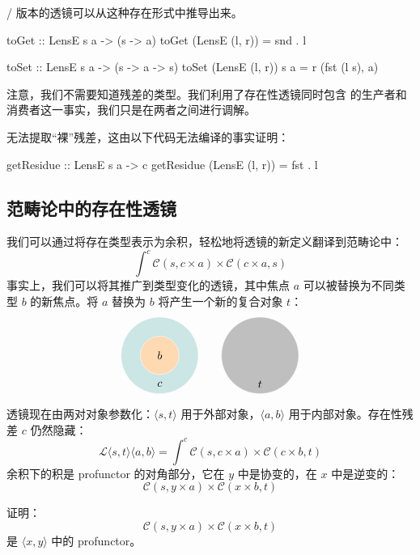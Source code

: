 \documentclass[DaoFP]{subfiles}
\begin{document}
/ 版本的透镜可以从这种存在形式中推导出来。
\begin{haskell}
toGet :: LensE s a -> (s -> a)
toGet (LensE (l, r)) = snd . l

toSet :: LensE s a -> (s -> a -> s)
toSet (LensE (l, r)) s a = r (fst (l s), a)
\end{haskell}

注意，我们不需要知道残差的类型。我们利用了存在性透镜同时包含  的生产者和消费者这一事实，我们只是在两者之间进行调解。

无法提取“裸”残差，这由以下代码无法编译的事实证明：
\begin{haskell}
getResidue :: LensE s a -> c
getResidue (LensE (l, r)) = fst . l
\end{haskell}

\subsection{范畴论中的存在性透镜}

我们可以通过将存在类型表示为余积，轻松地将透镜的新定义翻译到范畴论中：
\[ \int^{c} \mathcal{C}(s, c \times a) \times  \mathcal{C}(c \times a, s) \]
事实上，我们可以将其推广到类型变化的透镜，其中焦点 $a$ 可以被替换为不同类型 $b$ 的新焦点。将 $a$ 替换为 $b$ 将产生一个新的复合对象 $t$：
\[
\begin{tikzpicture}
\filldraw[fill=blue!50!green!20, draw=white] (0, 0) circle (1.2);
\filldraw[fill=orange!30, draw=white] (0, 0) circle (0.6);
\node at (0, 0) {$b$};
\node at (0, -0.9) {$c$};
\end{tikzpicture}
\hspace{20pt}
\begin{tikzpicture}
\filldraw[fill=gray!50, draw=white] (0, 0) circle (1.2);
\node at (0, -0.9) {$t$};
\end{tikzpicture}
\]

透镜现在由两对对象参数化：$\langle s, t\rangle$ 用于外部对象，$ \langle a, b \rangle$ 用于内部对象。存在性残差 $c$ 仍然隐藏：
\[ \mathcal{L}\langle s, t\rangle \langle a, b \rangle = \int^{c} \mathcal{C}(s, c \times a) \times  \mathcal{C}(c \times b, t) \]
余积下的积是 profunctor 的对角部分，它在 $y$ 中是协变的，在 $x$ 中是逆变的：
\[ \mathcal{C}(s, y \times a) \times  \mathcal{C}(x \times b, t) \]
\begin{exercise}
证明：
\[ \mathcal{C}(s, y \times a) \times  \mathcal{C}(x \times b, t) \]
是 $\langle x, y\rangle$ 中的 profunctor。
\end{exercise}
\end{document}
